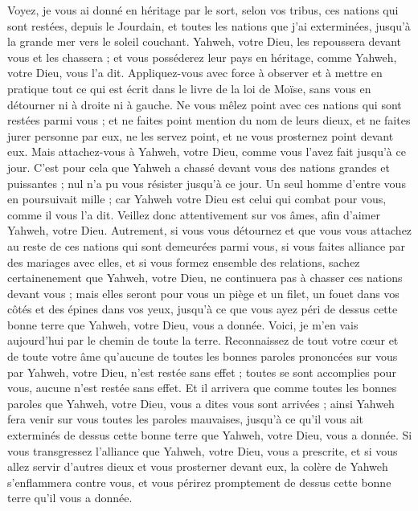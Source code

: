 \begin{multicols}{2}
Voyez, je vous ai donné en héritage par le sort, selon vos tribus, ces nations qui sont restées, depuis le Jourdain, et toutes les nations que j'ai exterminées, jusqu'à la grande mer vers le soleil couchant.
Yahweh, votre Dieu, les repoussera devant vous et les chassera ; et vous posséderez leur pays en héritage, comme Yahweh, votre Dieu, vous l'a dit.
Appliquez-vous avec force à observer et à mettre en pratique tout ce qui est écrit dans le livre de la loi de Moïse, sans vous en détourner ni à droite ni à gauche.
Ne vous mêlez point avec ces nations qui sont restées parmi vous ; et ne faites point mention du nom de leurs dieux, et ne faites jurer personne par eux, ne les servez point, et ne vous prosternez point devant eux.
Mais attachez-vous à Yahweh, votre Dieu, comme vous l'avez fait jusqu'à ce jour.
C'est pour cela que Yahweh a chassé devant vous des nations grandes et puissantes ; nul n'a pu vous résister jusqu'à ce jour.
Un seul homme d'entre vous en poursuivait mille ; car Yahweh votre Dieu est celui qui combat pour vous, comme il vous l'a dit.
Veillez donc attentivement sur vos âmes, afin d'aimer Yahweh, votre Dieu.
Autrement, si vous vous détournez et que vous vous attachez au reste de ces nations qui sont demeurées parmi vous, si vous faites alliance par des mariages avec elles, et si vous formez ensemble des relations,
sachez certainenement que Yahweh, votre Dieu, ne continuera pas à chasser ces nations devant vous ; mais elles seront pour vous un piège et un filet, un fouet dans vos côtés et des épines dans vos yeux, jusqu'à ce que vous ayez péri de dessus cette bonne terre que Yahweh, votre Dieu, vous a donnée.
Voici, je m'en vais aujourd'hui par le chemin de toute la terre. Reconnaissez de tout votre cœur et de toute votre âme qu'aucune de toutes les bonnes paroles prononcées sur vous par Yahweh, votre Dieu, n'est restée sans effet ; toutes se sont accomplies pour vous, aucune n'est restée sans effet.
Et il arrivera que comme toutes les bonnes paroles que Yahweh, votre Dieu, vous a dites vous sont arrivées ; ainsi Yahweh fera venir sur vous toutes les paroles mauvaises, jusqu'à ce qu'il vous ait exterminés de dessus cette bonne terre que Yahweh, votre Dieu, vous a donnée.
Si vous transgressez l'alliance que Yahweh, votre Dieu, vous a prescrite, et si vous allez servir d'autres dieux et vous prosterner devant eux, la colère de Yahweh s'enflammera contre vous, et vous périrez promptement de dessus cette bonne terre qu'il vous a donnée.

\end{multicols}
